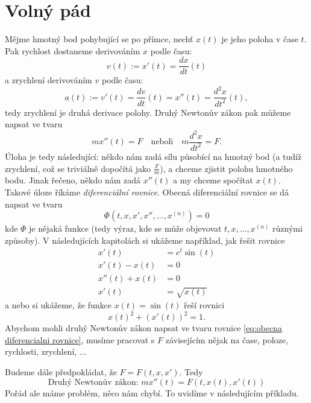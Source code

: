\section{Volný pád}\label{sec:volny pad}
Mějme hmotný bod pohybující se po přímce, nechť $x(t)$ je jeho poloha v čase $t.$ Pak rychlost dostaneme derivováním $x$ podle času:
\begin{equation*}
  v(t):=x'(t)=\frac{dx}{dt}(t)
\end{equation*}
a zrychlení derivováním $v$ podle času:
\begin{equation*}
  a(t):=v'(t)=\frac{dv}{dt}(t)=x''(t)=\frac{d^{2}x}{dt^{2}}(t),
\end{equation*}
tedy zrychlení je druhá derivace polohy. Druhý Newtonův zákon pak můžeme napsat ve tvaru
\begin{equation*}
	mx''(t)=F\quad \text{neboli}\quad m\frac{d^{2}x}{dt^{2}}=F.
\end{equation*}
Úloha je tedy následující: někdo nám zadá sílu působící na hmotný bod (a tudíž zrychlení, což se triviálně dopočítá jako $\frac{F}{m}$), a chceme zjistit polohu hmotného bodu. Jinak řečeno, někdo nám zadá $x''(t)$ a my chceme spočítat $x(t).$ Takové úloze říkáme \textit{diferenciální rovnice}. Obecná diferenciální rovnice se dá napsat ve tvaru
\begin{equation}\label{eq:obecna diferencialni rovnice}
  \Phi(t,x,x',x'', ..., x^{(n)})=0
\end{equation}
kde $\Phi$ je nějaká funkce (tedy výraz, kde se může objevovat $t, x,\hdots, x^{(n)}$ různými způsoby). V následujících kapitolách si ukážeme například, jak řešit rovnice
\begin{align*}
	x'(t) &= e^{t}\sin(t) \\
	x'(t)- x(t) &= 0 \\
	x''(t)+x(t) &= 0 \\
	x'(t) &= \sqrt{x(t)}
\end{align*}
a nebo si ukážeme, že funkce $x(t)=\sin(t)$ řeší rovnici
\begin{equation*}
  x(t)^{2}+(x'(t))^{2}=1.
\end{equation*}
Abychom mohli druhý Newtonův zákon napsat ve tvaru rovnice \ref{eq:obecna diferencialni rovnice}, musíme pracovat s $F$ závisejícím nějak na čase, poloze, rychlosti, zrychlení, ...

Budeme dále předpokládat, že $F=F(t,x,x').$ Tedy
\begin{equation*}
	\boxed{\text{Druhý Newtonův zákon: } mx''(t)=F(t,x(t),x'(t))}
\end{equation*}
Pořád ale máme problém, něco nám chybí. To uvidíme v následujícím příkladu.

